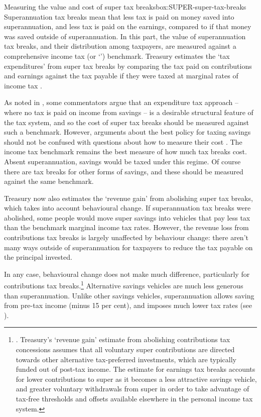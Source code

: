 \begin{smallbox}[tp]{Measuring the value and cost of super tax breaks}{box:SUPER-super-tax-breaks}
Superannuation tax breaks mean that less tax is paid on money saved into superannuation, and less tax is paid on the earnings, compared to if that money was saved outside of superannuation. In this part, the value of superannuation tax breaks, and their distribution among taxpayers, are measured against a comprehensive income tax (or ‘\TTE’) benchmark. Treasury estimates the ‘tax expenditures’ from super tax breaks by comparing the tax paid on contributions and earnings against the tax payable if they were taxed at marginal rates of income tax \textcite{Treasury2015TES2014}. 

As noted in , some commentators argue that an expenditure tax approach – where no tax is paid on income from savings – is a desirable structural feature of the tax system, and so the cost of super tax breaks should be measured against such a benchmark. However, arguments about the best policy for taxing savings should not be confused with questions about how to measure their cost \textcite{DaleyWoodCoates2015}. The income tax benchmark remains the best measure of how much tax breaks cost. Absent superannuation, savings would be taxed under this regime. Of course there are tax breaks for other forms of savings, and these should be measured against the same benchmark. 

Treasury now also estimates the ‘revenue gain’ from abolishing super tax breaks, which takes into account behavioural change. If superannuation tax breaks were abolished, some people would move super savings into vehicles that pay less tax than the benchmark marginal income tax rates. However, the revenue loss from contributions tax breaks is largely unaffected by behaviour change: there aren’t many ways outside of superannuation for taxpayers to reduce the tax payable on the principal invested. 
\end{smallbox}

In any case, behavioural change does not make much difference, particularly for contributions tax breaks.\footnote{\textcite[][124]{Treasury2015TES2014}. Treasury’s ‘revenue gain’ estimate from abolishing contributions tax concessions assumes that all voluntary super contributions are directed towards other alternative tax-preferred investments, which are typically funded out of post-tax income. The estimate for earnings tax breaks accounts for lower contributions to super as it becomes a less attractive savings vehicle, and greater voluntary withdrawals from super in order to take advantage of tax-free thresholds and offsets available elsewhere in the personal income tax system.}  
Alternative savings vehicles are much less generous than superannuation. Unlike other savings vehicles, superannuation allows saving from pre-tax income (minus 15 per cent), and imposes much lower tax rates (see ). 

